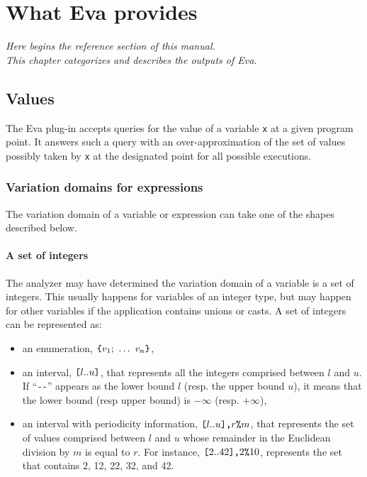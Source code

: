 \documentclass[web]{frama-c-book}
\newcommand{\bropen}{\mbox{\tt [}}
\newcommand{\brclose}{\mbox{\tt ]}}
\newcommand{\cbopen}{\mbox{\tt \{}}
\newcommand{\cbclose}{\mbox{\tt \}}}
\newcommand{\Eva}{\textsf{Eva}}
\begin{document}
\chapter{What \Eva{} provides}\label{what}
\vspace{2cm}

{\em Here begins the reference section of this manual.\\
This chapter categorizes and describes the outputs of \Eva{}.}

\vspace{2cm}

\section{Values}
\label{sec:values}

The \Eva{} plug-in accepts queries for the value of
a variable \lstinline|x| at a given program point. It answers such a
query with an over-approximation of the set of values possibly taken
by \lstinline|x| at the designated point for all possible executions.


\subsection{Variation domains for expressions}\label{valeurs}


The variation domain of a variable or expression can take one of
the shapes described below.

\subsubsection{A set of integers}
The analyzer may have determined the variation domain of a variable is
a set of integers.  This usually happens for variables of an integer
type, but may happen for other variables if the application contains
unions or casts. A set of integers can be represented as:

\begin{itemize}
\item an enumeration, $\cbopen v_1;\ \ldots\ v_n\cbclose$,
\item an interval, $\bropen l{\tt ..}u\brclose$, that represents all
  the integers comprised between $l$ and $u$. If ``\lstinline|--|'' appears
  as the lower bound $l$ (resp. the upper bound $u$), it means that the
  lower bound (resp upper bound) is $-\infty$ (resp. $+\infty$),
\item an interval with periodicity information,
  $\bropen l..u\brclose\mbox{\tt\/,}r\mbox{\tt \%}m$,
  that represents the set of values comprised between $l$ and $u$
  whose remainder in the Euclidean division by $m$ is equal to $r$.
  For instance, $\bropen 2..42\brclose\mbox{\tt\/,}2\mbox{\tt \%}10$,
  represents the set that contains 2, 12, 22, 32, and 42.
\end{itemize}
\end{document}

